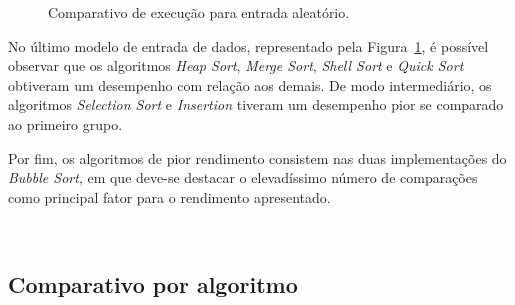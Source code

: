 \documentclass[conference,onecolumn]{IEEEtran}
\begin{document}
\begin{figure}[H]

\centering
{}

\caption{Comparativo de execução para entrada aleatório.}
\label{image: aleatoria}
\end{figure}

No último modelo de entrada de dados, representado pela Figura~\ref{image: aleatoria}, é possível observar que os algoritmos \textit{Heap Sort}, \textit{Merge Sort}, \textit{Shell Sort} e \textit{Quick Sort} obtiveram um desempenho com relação aos demais. De modo intermediário, os algoritmos \textit{Selection Sort} e \textit{Insertion} tiveram um desempenho pior se comparado ao primeiro grupo. 

Por fim, os algoritmos de pior rendimento consistem nas duas implementações do \textit{Bubble Sort}, em que deve-se destacar o elevadíssimo número de comparações como principal fator para o rendimento apresentado.

~\\
\subsection{Comparativo por algoritmo}
\end{document}
